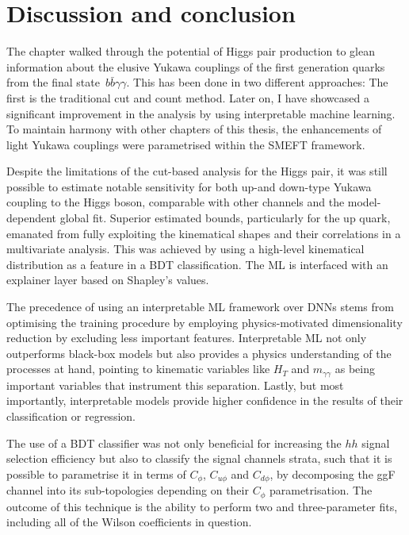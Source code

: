 \section{Discussion and conclusion \label{sec:concly}}
\par The chapter walked through the potential of Higgs pair production to glean information about the elusive Yukawa couplings of the first generation quarks from the final state~$b\bar{b}\gamma \gamma$. This has been done in two different approaches: The first is the traditional cut and count method. Later on, I have showcased a significant improvement in the analysis by using interpretable machine learning.   To maintain harmony with other chapters of this thesis, the enhancements of light Yukawa couplings were parametrised within the SMEFT framework. 
\par Despite the limitations of the cut-based analysis for the Higgs pair, it was still possible to estimate notable sensitivity for both up-and down-type Yukawa coupling to the Higgs boson, comparable with other channels and the model-dependent global fit.  Superior estimated bounds, particularly for the up quark, emanated from fully exploiting the kinematical shapes and their correlations in a multivariate analysis. This was achieved by using a high-level kinematical distribution as a feature in a BDT classification. The ML is interfaced with an explainer layer based on Shapley's values. 
\par The precedence of using an interpretable ML framework over DNNs stems from optimising the training procedure by employing physics-motivated dimensionality reduction by excluding less important features.  Interpretable ML not only outperforms black-box models but also provides a physics understanding of the processes at hand, pointing to kinematic variables like $H_T$ and $m_{\gamma\gamma}$ as being important variables that instrument this separation. Lastly, but most importantly,  interpretable models provide higher confidence in the results of their classification or regression.
\par The use of a BDT classifier was not only beneficial for increasing the $hh$ signal selection efficiency but also to classify the signal channels strata, such that it is possible to parametrise it in terms of $C_{\phi}$, $C_{u\phi}$ and $C_{d \phi}$, by decomposing the ggF channel into its sub-topologies depending on their $C_\phi$ parametrisation.   The outcome of this technique is the ability to perform two and three-parameter fits, including all of the Wilson coefficients in question. 
